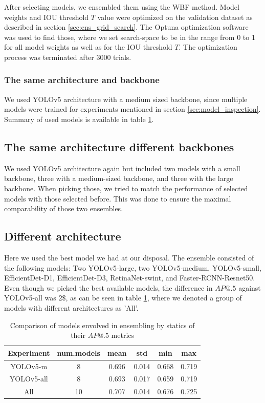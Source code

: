 After selecting models, we ensembled them using the WBF method. Model weights and IOU threshold $T$ value were optimized on the validation dataset as described in section \ref{sec:ens_grid_search}. The Optuna optimization software was used to find those, where we set search-space to be in the range from 0 to 1 for all model weights as well as for the IOU threshold $T$. The optimization process was terminated after $3000$ trials.

\subsubsection{The same architecture and backbone}
We used YOLOv5 architecture with a medium sized backbone, since multiple models were trained for experiments mentioned in section \ref{sec:model_inspection}. Summary of used models is available in table \ref{tab:ensemble_models_involved}.

\subsection{The same architecture different backbones}
We used YOLOv5 architecture again but included two models with a small backbone, three with a medium-sized backbone, and three with the large backbone. When picking those, we tried to match the performance of selected models with those selected before. This was done to ensure the maximal comparability of those two ensembles.

\subsection{Different architecture}
Here we used the best model we had at our disposal. The ensemble consisted of the following models: Two YOLOv5-large, two YOLOv5-medium, YOLOv5-small, EfficientDet-D1, EfficientDet-D3, RetinaNet-swint, and Faster-RCNN-Resnet50. Even though we picked the best available models, the difference in $AP@.5$ against YOLOv5-all was $2\$$, as can be seen in table \ref{tab:ensemble_models_involved}, where we denoted a group of models with different architectures as 'All'.

\begin{table}[h]
    \centering
    \begin{tabular}{|c|c|c|c|c|c|}
        \hline
        Experiment & num.models & mean  & std   & min   & max   \\ \hline
        YOLOv5-m   & 8          & 0.696 & 0.014 & 0.668 & 0.719 \\ \hline
        YOLOv5-all & 8          & 0.693 & 0.017 & 0.659 & 0.719 \\ \hline
        All        & 10         & 0.707 & 0.014 & 0.676 & 0.725 \\ \hline
    \end{tabular}
    \caption{Comparison of models envolved in ensembling by statics of their $AP@.5$ metrics}
    \label{tab:ensemble_models_involved}
\end{table}


